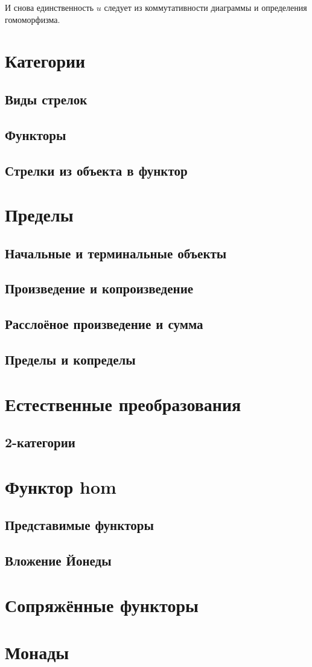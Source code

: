 \documentclass[10pt, a4paper]{article}
\theoremstyle{colon}
\begin{document}
И снова единственность \( u \) следует из коммутативности диаграммы и определения гомоморфизма.

\section{Категории}

\subsection{Виды стрелок}
\subsection{Функторы}
\subsection{Стрелки из объекта в функтор}

\section{Пределы}

\subsection{Начальные и терминальные объекты}
\subsection{Произведение и копроизведение}
\subsection{Расслоёное произведение и сумма}
\subsection{Пределы и копределы}

\section{Естественные преобразования}

\subsection{2-категории}

\section{Функтор hom}

\subsection{Представимые функторы}
\subsection{Вложение Йонеды}

\section{Сопряжённые функторы}
\section{Монады}
\end{document}
